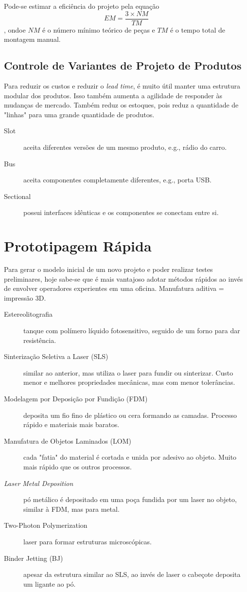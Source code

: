 \documentclass[a4paper]{report}
\begin{document}
Pode-se estimar a eficiência do projeto pela equação \[
EM = \frac{3\times NM}{TM}
\], ondoe $NM$ é o número mínimo teórico de peças e $TM$ é o tempo total de montagem manual.

\subsection*{Controle de Variantes de Projeto de Produtos}

Para reduzir os custos e reduzir o \emph{lead time}, é muito útil manter uma estrutura modular dos produtos. Isso também aumenta a agilidade de responder às mudanças de mercado. Também reduz os estoques, pois reduz a quantidade de "linhas" para uma grande quantidade de produtos.

\begin{description}
    \item[Slot] aceita diferentes versões de um mesmo produto, e.g., rádio do carro.
    \item[Bus] aceita componentes completamente diferentes, e.g., porta USB.
    \item[Sectional] possui interfaces idênticas e os componentes se conectam entre si.
\end{description}

\section*{Prototipagem Rápida}

Para gerar o modelo inicial de um novo projeto e poder realizar testes preliminares, hoje sabe-se que é mais vantajoso adotar métodos rápidos ao invés de envolver operadores experientes em uma oficina. Manufatura aditiva = impressão 3D.

\begin{description}
    \item[Estereolitografia] tanque com polímero líquido fotosensitivo, seguido de um forno para dar resistência.
    \item[Sinterização Seletiva a Laser (SLS)] similar ao anterior, mas utiliza o laser para fundir ou sinterizar. Custo menor e melhores propriedades mecânicas, mas com menor tolerâncias.
    \item[Modelagem por Deposição por Fundição (FDM)] deposita um fio fino de plástico ou cera formando as camadas. Processo rápido e materiais mais baratos.
    \item[Manufatura de Objetos Laminados (LOM)] cada "fatia" do material é cortada e unida por adesivo ao objeto. Muito mais rápido que os outros processos.
    \item[\emph{Laser Metal Deposition}] pó metálico é depositado em uma poça fundida por um laser no objeto, similar à FDM, mas para metal.
    \item[Two-Photon Polymerization] laser para formar estruturas microscópicas.
    \item[Binder Jetting (BJ)] apesar da estrutura similar ao SLS, ao invés de laser o cabeçote deposita um ligante ao pó.
\end{description}
\end{document}
